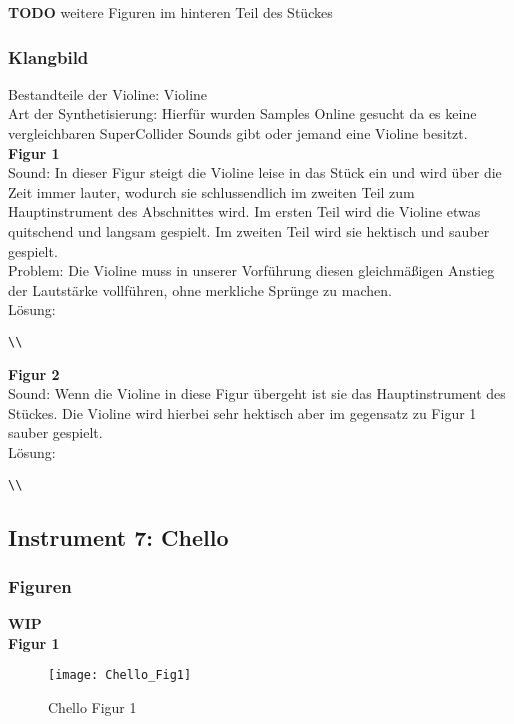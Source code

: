 \documentclass[
10pt, %
a4paper, %
oneside, %
headinclude,footinclude, %
BCOR5mm, %
]{scrartcl}
\begin{document}
{\color{red}\textbf{TODO}} weitere Figuren im hinteren Teil des Stückes

\subsubsection{Klangbild}
Bestandteile der Violine: Violine\\
Art der Synthetisierung: Hierfür wurden Samples Online gesucht da es keine vergleichbaren SuperCollider Sounds gibt oder jemand eine Violine besitzt.\\
\noindent\textbf{Figur 1}\\
Sound: In dieser Figur steigt die Violine leise in das Stück ein und wird über die Zeit immer lauter, wodurch sie schlussendlich im zweiten Teil 
zum Hauptinstrument des Abschnittes wird. Im ersten Teil wird die Violine etwas quitschend und langsam gespielt. Im zweiten Teil wird sie hektisch und sauber gespielt.\\
Problem: Die Violine muss in unserer Vorführung diesen gleichmäßigen Anstieg der Lautstärke vollführen, ohne merkliche Sprünge zu machen.\\
Lösung:\\
\begin{lstlisting}
\\
\end{lstlisting}
\noindent\textbf{Figur 2}\\
Sound: Wenn die Violine in diese Figur übergeht ist sie das Hauptinstrument des Stückes. Die Violine wird hierbei sehr hektisch aber im gegensatz zu Figur 1 sauber gespielt.\\
Lösung:\\
\begin{lstlisting}
\\
\end{lstlisting}



\subsection{Instrument 7: Chello}
\subsubsection{Figuren}
{\color{orange}\textbf{WIP}} \\
\noindent\textbf{Figur 1}\\
\begin{figure}[h]
	\centering 
	\texttt{[image: Chello\_Fig1]} 
	\caption{Chello Figur 1}
\end{figure}
\end{document}
